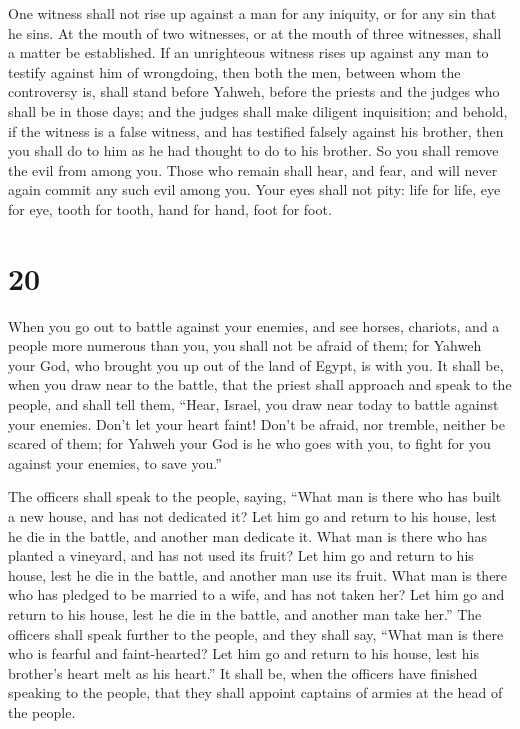  One witness shall not rise up against a man for any
iniquity, or for any sin that he sins. At the mouth of two witnesses, or
at the mouth of three witnesses, shall a matter be established.
 If an unrighteous witness rises up against any man to
testify against him of wrongdoing,  then both the men,
between whom the controversy is, shall stand before Yahweh, before the
priests and the judges who shall be in those days;  and the
judges shall make diligent inquisition; and behold, if the witness is a
false witness, and has testified falsely against his brother,
 then you shall do to him as he had thought to do to his
brother. So you shall remove the evil from among you. 
Those who remain shall hear, and fear, and will never again commit any
such evil among you.  Your eyes shall not pity: life for
life, eye for eye, tooth for tooth, hand for hand, foot for foot.

\hypertarget{section-19}{%
\section{20}\label{section-19}}

 When you go out to battle against your enemies, and see
horses, chariots, and a people more numerous than you, you shall not be
afraid of them; for Yahweh your God, who brought you up out of the land
of Egypt, is with you.  It shall be, when you draw near to
the battle, that the priest shall approach and speak to the people,
 and shall tell them, ``Hear, Israel, you draw near today to
battle against your enemies. Don't let your heart faint! Don't be
afraid, nor tremble, neither be scared of them;  for Yahweh
your God is he who goes with you, to fight for you against your enemies,
to save you.''

 The officers shall speak to the people, saying, ``What man
is there who has built a new house, and has not dedicated it? Let him go
and return to his house, lest he die in the battle, and another man
dedicate it.  What man is there who has planted a vineyard,
and has not used its fruit? Let him go and return to his house, lest he
die in the battle, and another man use its fruit.  What man
is there who has pledged to be married to a wife, and has not taken her?
Let him go and return to his house, lest he die in the battle, and
another man take her.''  The officers shall speak further to
the people, and they shall say, ``What man is there who is fearful and
faint-hearted? Let him go and return to his house, lest his brother's
heart melt as his heart.''  It shall be, when the officers
have finished speaking to the people, that they shall appoint captains
of armies at the head of the people.

